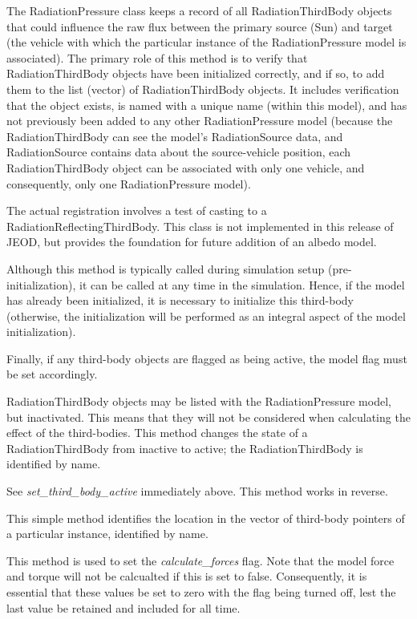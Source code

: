 {\begin{enumerate}
{\begin{enumerate}
The RadiationPressure class keeps a record of all RadiationThirdBody objects
that could influence the raw flux between the primary source (Sun) and target
(the vehicle with which the particular instance of the RadiationPressure model
is associated).  The primary role of this method is to verify that
RadiationThirdBody objects have been initialized correctly, and if so, to add
them to the list (vector) of RadiationThirdBody objects.  It includes
verification that the object exists, is named with a unique name (within this
model), and has not previously been added to any other RadiationPressure model
(because the RadiationThirdBody can see the model's RadiationSource data, and
RadiationSource contains data about the source-vehicle position, each
RadiationThirdBody object can be associated with only one vehicle, and
consequently, only one RadiationPressure model).

The actual registration involves a test of casting to a
RadiationReflectingThirdBody.  This class is not implemented in this release of
JEOD, but provides the foundation for future addition of an albedo model.

Although this method is typically called during simulation setup
(pre-initialization), it can be called at any time in the simulation.  Hence,
if the model has already been initialized, it is necessary to initialize this
third-body (otherwise, the initialization will be performed as an integral
aspect of the model initialization).

Finally, if any third-body objects are flagged as being active, the model flag
must be set accordingly.

RadiationThirdBody objects may be listed with the RadiationPressure model, but
inactivated.  This means that they will not be considered when calculating the
effect of the third-bodies.  This method changes the state of a
RadiationThirdBody from inactive to active; the RadiationThirdBody is
identified by name.


See \textit{set\_third\_body\_active} immediately above.  This method works in
reverse.

This simple method identifies the location in the vector of third-body pointers
of a particular instance, identified by name.

This method is used to set the \textit{calculate\_forces} flag.  Note that the model force and torque will not be calcualted if this is set to false.  Consequently, it is essential that these values be set to zero with the flag being turned off, lest the last value be retained and included for all time.
\end{enumerate}}



\end{enumerate}}
